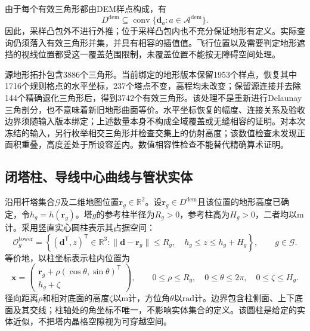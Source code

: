 由于每个有效三角形都由DEM样点构成，有
\begin{equation}
 D^{\mathrm{dem}}
 \subseteq\operatorname{conv}
       \{\mathbf d_a:a\in\mathcal A^{\mathrm{dem}}\}.
 \label{s0406:domain_hull_relation}
\end{equation}
因此，采样凸包外不进行外推；位于采样凸包内也不充分保证地形有定义。实际查询仍须落入有效三角形并集，并具有相容的插值值。飞行位置以及需要判定地形遮挡的视线位置都受这一覆盖范围限制，未覆盖位置不能按无障碍空间处理。

源地形拓扑包含3886个三角形。当前绑定的地形版本保留1953个样点，恢复其中1716个规则格点的水平坐标，237个塔点不变，高程均未改变；保留源连接并去除144个精确退化三角形后，得到3742个有效三角形。该处理不是重新进行Delaunay三角剖分，也不意味着新旧地形曲面等价。水平坐标恢复的幅度、连接关系及验收边界须随输入版本绑定；上述数量本身不构成全域覆盖或无缝相容的证明。对本次冻结的输入，另行枚举相交三角形并检查交集上的仿射高度；该数值检查未发现正面积重叠，高度差处于所设容差内。数值相容性检查不能替代精确算术证明。

\subsection{闭塔柱、导线中心曲线与管状实体}

沿用杆塔集合$\mathcal G$及二维地图位置$\mathbf r_g\in\mathbb R^2$。设$\mathbf r_g\in D^{\mathrm{dem}}$且该位置的地形高度已确定，令$h_g=h(\mathbf r_g)$。塔$g$的参考柱半径为$R_g>0$，参考柱高为$H_g>0$，二者均以$\mathrm m$计。采用竖直实心圆柱表示其占据空间：
\begin{equation}
 \mathcal O_g^{\mathrm{tower}}
 =\left\{(\mathbf d^{\mathsf T},z)^{\mathsf T}\in\mathbb R^3:
 \|\mathbf d-\mathbf r_g\|\le R_g,\quad
 h_g\le z\le h_g+H_g\right\},
 \qquad g\in\mathcal G.
 \label{s0406:tower_solid}
\end{equation}
等价地，以柱坐标表示柱内位置为
\begin{equation}
 \mathbf x=
 \begin{pmatrix}
 \mathbf r_g+\rho(\cos\theta,\sin\theta)^{\mathsf T}\\
 h_g+\zeta
 \end{pmatrix},
 \qquad
 0\le\rho\le R_g,\quad
 0\le\theta\le2\pi,\quad
 0\le\zeta\le H_g.
 \label{s0406:tower_cylindrical_coordinates}
\end{equation}
径向距离$\rho$和相对底面的高度$\zeta$以$\mathrm m$计，方位角$\theta$以$\mathrm{rad}$计。边界包含柱侧面、上下底面及其交线；柱轴处的角坐标不唯一，不影响实体集合的定义。该圆柱是给定的实体近似，不把塔内晶格空隙视为可穿越空间。

